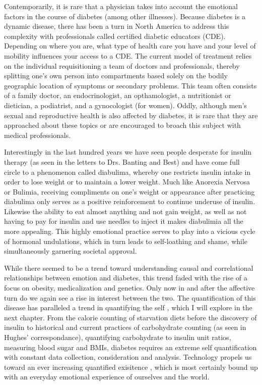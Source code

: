 \documentclass[12pt]{article}
\begin{document}
Contemporarily, it is rare that a physician takes into account the emotional factors in the course of diabetes (among other illnesses). Because diabetes is a dynamic disease, there has been a turn in North America to address this complexity with professionals called certified diabetic educators (CDE). Depending on where you are, what type of health care you have and your level of mobility influences your access to a CDE. The current model of treatment relies on the individual requisitioning a team of doctors and professionals, thereby splitting one's own person into compartments based solely on the bodily geographic location of symptoms or secondary problems. This team often consists of a family doctor, an endocrinologist, an opthamologist, a nutritionist or dietician, a podiatrist, and a gynocologist (for women). Oddly, although men's sexual and reproductive health is also affected by diabetes, it is rare that they are approached about these topics or are encouraged to broach this subject with medical professionals. 

Interestingly in the last hundred years we have seen people desperate for insulin therapy (as seen in the letters to Drs. Banting and Best) and have come full circle to a phenomenon called diabulima, whereby one restricts insulin intake in order to lose weight or to maintain a lower weight. Much like Anorexia Nervosa or Bulimia, receiving compliments on one's weight or appearance after practicing diabulima only serves as a positive reinforcement to continue underuse of insulin. Likewise the ability to eat almost anything and not gain weight, as well as not having to pay for insulin and use needles to inject it makes diabulimia all the more appealing. This highly emotional practice serves to play into a vicious cycle of hormonal undulations, which in turn leads to self-loathing and shame, while simultaneously garnering societal approval. 

While there seemed to be a trend toward understanding causal and correlational relationships between emotion and diabetes, this trend faded with the rise of a focus on obesity, medicalization and genetics. Only now in and after the affective turn do we again see a rise in interest between the two. The quantification of this disease has paralleled a trend in quantifying the self \citep{lupton_critical_2013}, which I will explore in the next chapter. From the calorie counting of starvation diets before the discovery of insulin to historical and current practices of carbohydrate counting (as seen in Hughes' correspondance), quantifying carbohydrate to insulin unit ratios, measuring blood sugar and BMIs, diabetes requires an extreme self quantification with constant data collection, consideration and analysis. Technology propels us toward an ever increasing quantified exisitence \citep{lupton_technology_2000}, which is most certainly bound up with an everyday emotional experience of ourselves and the world. 
\end{document}

